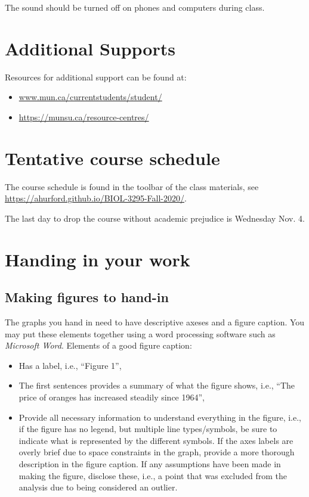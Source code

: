 \documentclass[]{book}
\begin{document}
The sound should be turned off on phones and computers during class.

\section{Additional Supports}\label{additional-supports}

Resources for additional support can be found at:

\begin{itemize}
\item
  \url{www.mun.ca/currentstudents/student/}
\item
  \url{https://munsu.ca/resource-centres/}
\end{itemize}

\section{Tentative course schedule}\label{tentative-course-schedule}

The course schedule is found in the toolbar of the class materials, see
\url{https://ahurford.github.io/BIOL-3295-Fall-2020/}.

The last day to drop the course without academic prejudice is Wednesday
Nov. 4.

\section{Handing in your work}\label{handing-in-your-work}

\subsection{Making figures to hand-in}\label{figures}

The graphs you hand in need to have descriptive axeses and a figure
caption. You may put these elements together using a word processing
software such as \emph{Microsoft Word}. Elements of a good figure
caption:

\begin{itemize}
\item
  Has a label, i.e., ``Figure 1'',
\item
  The first sentences provides a summary of what the figure shows, i.e.,
  ``The price of oranges has increased steadily since 1964'',
\item
  Provide all necessary information to understand everything in the
  figure, i.e., if the figure has no legend, but multiple line
  types/symbols, be sure to indicate what is represented by the
  different symbols. If the axes labels are overly brief due to space
  constraints in the graph, provide a more thorough description in the
  figure caption. If any assumptions have been made in making the
  figure, disclose these, i.e., a point that was excluded from the
  analysis due to being considered an outlier.
\end{itemize}
\end{document}
